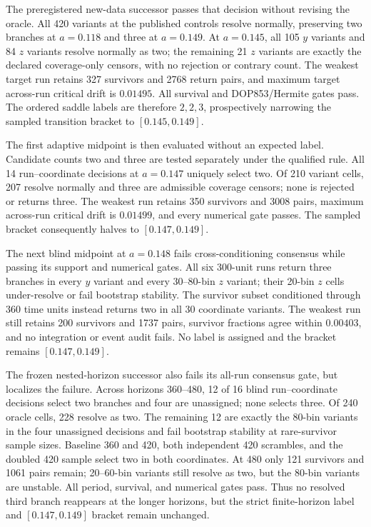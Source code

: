 The preregistered new-data successor passes that decision without revising the
oracle.  All 420 variants at the published controls resolve normally,
preserving two branches at $a=0.118$ and three at $a=0.149$.  At $a=0.145$,
all 105 $y$ variants and 84 $z$ variants resolve normally as two; the remaining
21 $z$ variants are exactly the declared coverage-only censors, with no
rejection or contrary count.  The weakest target run retains 327 survivors and
2768 return pairs, and maximum target across-run critical drift is $0.01495$.
All survival and DOP853/Hermite gates pass.  The ordered saddle labels are
therefore $2,2,3$, prospectively narrowing the sampled transition bracket to
$[0.145,0.149]$.

The first adaptive midpoint is then evaluated without an expected label.
Candidate counts two and three are tested separately under the qualified rule.
All 14 run--coordinate decisions at $a=0.147$ uniquely select two.  Of 210
variant cells, 207 resolve normally and three are admissible coverage censors;
none is rejected or returns three.  The weakest run retains 350 survivors and
3008 pairs, maximum across-run critical drift is $0.01499$, and every numerical
gate passes.  The sampled bracket consequently halves to $[0.147,0.149]$.

The next blind midpoint at $a=0.148$ fails cross-conditioning consensus while
passing its support and numerical gates.  All six 300-unit runs return three
branches in every $y$ variant and every 30--80-bin $z$ variant; their 20-bin
$z$ cells under-resolve or fail bootstrap stability.  The survivor subset
conditioned through 360 time units instead returns two in all 30 coordinate
variants.  The weakest run still retains 200 survivors and 1737 pairs, survivor
fractions agree within $0.00403$, and no integration or event audit fails.  No
label is assigned and the bracket remains $[0.147,0.149]$.

The frozen nested-horizon successor also fails its all-run consensus gate, but
localizes the failure.  Across horizons 360--480, 12 of 16 blind
run--coordinate decisions select two branches and four are unassigned; none
selects three.  Of 240 oracle cells, 228 resolve as two.  The remaining 12 are
exactly the 80-bin variants in the four unassigned decisions and fail
bootstrap stability at rare-survivor sample sizes.  Baseline 360 and 420,
both independent 420 scrambles, and the doubled 420 sample select two in both
coordinates.  At 480 only 121 survivors and 1061 pairs remain; 20--60-bin
variants still resolve as two, but the 80-bin variants are unstable.  All
period, survival, and numerical gates pass.  Thus no resolved third branch
reappears at the longer horizons, but the strict finite-horizon label and
$[0.147,0.149]$ bracket remain unchanged.

